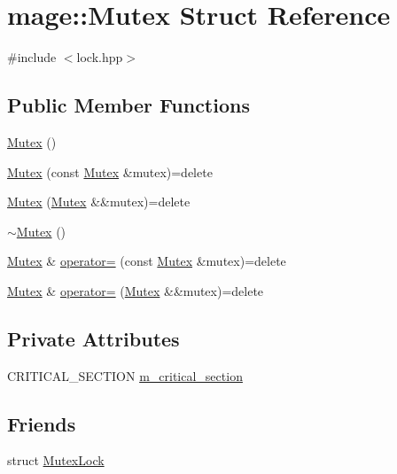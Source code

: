 \hypertarget{structmage_1_1_mutex}{}\section{mage\+:\+:Mutex Struct Reference}
\label{structmage_1_1_mutex}


{\ttfamily \#include $<$lock.\+hpp$>$}

\subsection*{Public Member Functions}
\begin{DoxyCompactItemize}
\item 
\hyperlink{structmage_1_1_mutex_ab22db01311271ef54642b10ea53dfd8a}{Mutex} ()
\item 
\hyperlink{structmage_1_1_mutex_af1c2c7d0134ba853903522d2f3684f22}{Mutex} (const \hyperlink{structmage_1_1_mutex}{Mutex} \&mutex)=delete
\item 
\hyperlink{structmage_1_1_mutex_a4ec1fd645bcea634f957552d1dfa3565}{Mutex} (\hyperlink{structmage_1_1_mutex}{Mutex} \&\&mutex)=delete
\item 
\hyperlink{structmage_1_1_mutex_a143d82ec7bb43f953a1703caa7972e9d}{$\sim$\+Mutex} ()
\item 
\hyperlink{structmage_1_1_mutex}{Mutex} \& \hyperlink{structmage_1_1_mutex_a56072bdabdeadd5d897de232dbd298a0}{operator=} (const \hyperlink{structmage_1_1_mutex}{Mutex} \&mutex)=delete
\item 
\hyperlink{structmage_1_1_mutex}{Mutex} \& \hyperlink{structmage_1_1_mutex_aaef0078f5b70afb0e5a290a5b5f33680}{operator=} (\hyperlink{structmage_1_1_mutex}{Mutex} \&\&mutex)=delete
\end{DoxyCompactItemize}
\subsection*{Private Attributes}
\begin{DoxyCompactItemize}
\item 
C\+R\+I\+T\+I\+C\+A\+L\+\_\+\+S\+E\+C\+T\+I\+ON \hyperlink{structmage_1_1_mutex_a18414337aef28b7ed261e7a805d2c103}{m\+\_\+critical\+\_\+section}
\end{DoxyCompactItemize}
\subsection*{Friends}
\begin{DoxyCompactItemize}
\item 
struct \hyperlink{structmage_1_1_mutex_a058473d070063e5098732f355f432bd9}{Mutex\+Lock}
\end{DoxyCompactItemize}


